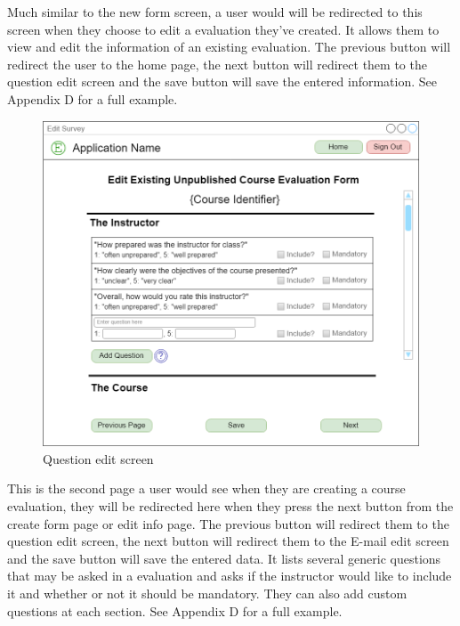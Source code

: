 \documentclass{article}
\begin{document}
Much similar to the new form screen, a user would will be redirected to this screen when they choose to edit a evaluation they've created. It allows them to view and edit the information of an existing evaluation.  The previous button will redirect the user to the home page, the next button will redirect them to the question edit screen and the save button will save the entered information. See Appendix D for a full example.

\begin{center}
\begin{figure}[H]
    \centering
    \caption{Question edit screen}
    \includegraphics[scale=.30]{images/questions_screen.png}
\end{figure}
\end{center}

This is the second page a user would see when they are creating a course evaluation, they will be redirected here when they press the next button from the create form page or edit info page.  The previous button will redirect them to the question edit screen, the next button will redirect them to the E-mail edit screen and the save button will save the entered data. It lists several generic questions that may be asked in a evaluation and asks if the instructor would like to include it and whether or not it should be mandatory. They can also add custom questions at each section.  See Appendix D for a full example.
\end{document}
